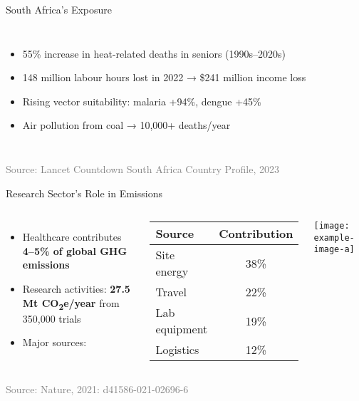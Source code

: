 \documentclass{beamer}
\newcommand{\highlight}[1]{\textcolor{taskred}{\textbf{#1}}}
\newcommand{\source}[1]{\vspace{0.3cm}\hfill\scriptsize\textcolor{gray}{Source: #1}}
\begin{document}
\begin{frame}{South Africa's Exposure}
\begin{columns}
\begin{itemize}[spacing=0.5em]
    \item \textcolor{taskred}{55\%} increase in heat-related deaths in seniors (1990s--2020s)
    \item \textcolor{taskred}{148 million} labour hours lost in 2022 → \$241 million income loss
    \item Rising vector suitability: malaria \textcolor{taskred}{+94\%}, dengue \textcolor{taskred}{+45\%}
    \item Air pollution from coal → \textcolor{taskred}{10,000+} deaths/year
\end{itemize}
\end{columns}

\source{Lancet Countdown South Africa Country Profile, 2023}
\end{frame}

\begin{frame}{Research Sector's Role in Emissions}
\begin{columns}
\begin{itemize}[spacing=0.5em]
    \item Healthcare contributes \highlight{4--5\% of global GHG emissions}
    \item Research activities: \highlight{27.5 Mt CO\textsubscript{2}e/year} from 350,000 trials
    \item Major sources:
\end{itemize}

\begin{center}
\begin{tabular}{lc}
\toprule
\textbf{Source} & \textbf{Contribution} \\
\midrule
Site energy & 38\% \\
Travel & 22\% \\
Lab equipment & 19\% \\
Logistics & 12\% \\
\bottomrule
\end{tabular}
\end{center}
\texttt{[image: example-image-a]} %
\end{columns}

\source{Nature, 2021: d41586-021-02696-6}
\end{frame}
\end{document}

